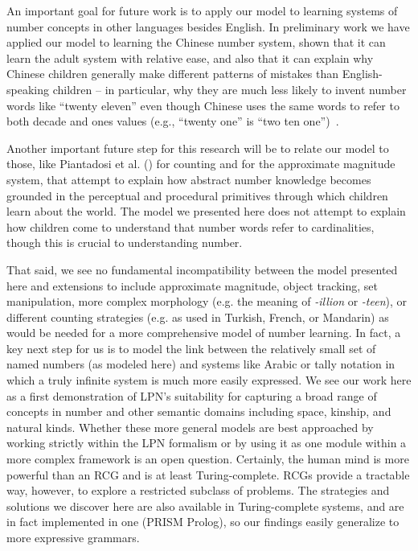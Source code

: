 \documentclass[10pt,letterpaper]{article}
\begin{document}
An important goal for future work is to apply our model to learning
systems of number concepts in other languages besides English.  In
preliminary work we have applied our model to learning the Chinese
number system, shown that it can learn the adult system with relative
ease, and also that it can explain why Chinese children generally make
different patterns of mistakes than English-speaking children -- in
particular, why they are much less likely to invent number words like
``twenty eleven'' even though Chinese uses the same words to refer to
both decade and ones values (e.g., ``twenty one'' is ``two ten one'')~\citep{miller1987counting}.

Another important future step for this research will be to relate our
model to those, like Piantadosi et al. (\citeyear{PianGoodTen2012})
for counting and \citet{dehaene2011number} for the approximate magnitude system,
that attempt to explain how abstract number knowledge becomes grounded
in the perceptual and procedural primitives through which children
learn about the world. The model we presented here does not attempt to
explain how children come to understand that number words refer to
cardinalities, though this is crucial to understanding number.

That said, we see no fundamental incompatibility between the model
presented here and extensions to include approximate magnitude, object
tracking, set manipulation, more complex morphology (e.g. the
meaning of \emph{-illion} or \emph{-teen}), or different counting
strategies (e.g. as used in Turkish, French, or Mandarin) as
would be needed for a more comprehensive model of number learning. In
fact, a key next step for us is to model the link between the
relatively small set of named numbers (as modeled here) and systems
like Arabic or tally notation in which a truly infinite system is much
more easily expressed. We see our work here as a first demonstration
of LPN's suitability for capturing a broad range of concepts in number
and other semantic domains including space, kinship, and natural
kinds. Whether these more general models are best approached by
working strictly within the LPN formalism or by using it as one module
within a more complex framework is an open question. Certainly, the
human mind is more powerful than an RCG and is at least
Turing-complete. RCGs provide a tractable way, however, to explore a
restricted subclass of problems. The strategies and solutions we
discover here are also available in Turing-complete systems, and are
in fact implemented in one (PRISM Prolog), so our findings easily
generalize to more expressive grammars.
\end{document}
